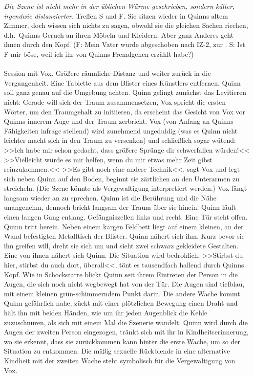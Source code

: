 % 
\emph{Die Szene ist nicht mehr in der üblichen Wärme geschrieben,}
\emph{sondern kälter, irgendwie distanzierter.} 
Treffen S und F. Sie sitzen wieder in Quinns altem Zimmer, doch wissen sich
nichts zu sagen, obwohl sie die gleichen Sachen riechen, d.h.~Quinns Geruch an
ihren Möbeln und Kleidern.
Aber ganz Anderes geht ihnen durch den Kopf. (F: Mein Vater wurde abgeschoben
nach IZ-2, zur . S: Ist F mir böse, weil ich ihr von Quinns
Fremdgehen erzählt habe?)\\\\
% 
Session mit Vox.
Größere räumliche Distanz und weiter zurück in die Vergangenheit. 
Eine Tablette aus dem Blister eines Künstlers entfernen. 
Quinn soll ganz genau auf die Umgebung achten. 
Quinn gelingt zunächst das Levitieren nicht: 
Gerade will sich der Traum zusammensetzen, Vox spricht die ersten Wörter, um den
Traumgehalt zu initiieren, da erscheint das Gesicht von Vox vor Quinns innerem
Auge und der Traum zerbricht. 
Vox (von Anfang an Quinns Fähigkeiten infrage stellend) wird zunehmend
ungeduldig (was es Quinn nicht leichter macht sich in den Traum zu versenken)
und schließlich sogar wütend: >>Ich habe mir schon gedacht, dass größere Sprünge
dir schwerfallen würden!<< 
>>Vielleicht würde es mir helfen, wenn du mir etwas mehr Zeit gibst
reinzukommen.<< 
>>Es gibt noch eine andere Technik<<, sagt Vox und legt sich neben Quinn auf den
Boden, beginnt sie zärtlichen an den Unterarmen zu streicheln. 
(Die Szene könnte als Vergewaltigung interpretiert werden.)
Vox fängt langsam wieder an zu sprechen. 
Quinn ist die Berührung und die Nähe unangenehm, dennoch bricht langsam der
Traum über sie hinein. 
Quinn läuft einen langen Gang entlang. 
Gefängniszellen links und recht. 
Eine Tür steht offen. 
Quinn tritt herein. 
Neben einem kargen Feldbett liegt auf einem kleinen, an der Wand befestigten
Metalltisch der Blister. 
Quinn nähert sich ihm. 
Kurz bevor sie ihn greifen will, dreht sie sich um und sieht zwei schwarz
gekleidete Gestalten. 
Eine von ihnen nähert sich Quinn. 
Die Situation wird bedrohlich. 
>>Stirbst du hier, stirbst du auch dort, überall<<, tönt es tausendfach hallend 
durch Quinns Kopf. 
Wie in Schockstarre blickt Quinn seit ihrem Eintreten der Person in die Augen,
die sich noch nicht wegbewegt hat von der Tür. 
Die Augen sind tiefblau, mit einem kleinen grün-schimmerndem Punkt darin. 
Die andere Wache kommt Quinn gefährlich nahe, zückt mit einer plötzlichen
Bewegung einen Draht und hält ihn mit beiden Händen, wie um ihr jeden Augenblick
die Kehle zuzuschnüren, als sich mit einem Mal die Szenerie wandelt. 
Quinn wird durch die Augen der zweiten Person eingezogen, tränkt sich mit ihr in
Kindheitserinnerung, wo sie erkennt, dass sie zurückkommen kann
hinter die erste Wache, um so der Situation zu entkommen. 
Die mäßig sexuelle Rückblende in eine alternative Kindheit mit der zweiten Wache
steht symbolisch für die Vergewaltigung von Vox. 

